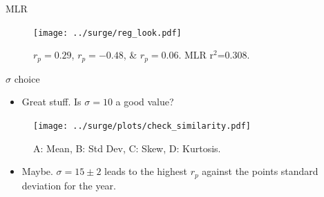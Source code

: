 \documentclass[usenames, dvipsnames]{beamer}
\begin{document}
\begin{frame}{MLR }
\vspace{-20pt}
\begin{figure}[htb!]
    \centering
    \hspace{-10pt}
    \texttt{[image: ../surge/reg\_look.pdf]}
    \vspace{-7pt}
   \caption{$r_p =0.29$, $r_p =-0.48$, &  $r_p=0.06$. MLR r$^2$=0.308.   }
    \label{fig:}
\end{figure}
\end{frame}


\begin{frame}{$\sigma$ choice}
\vspace{-20pt}
\begin{itemize}
\item Great stuff. Is $\sigma = 10$ a good value?
\end{itemize}
\vspace{-10pt}
\begin{figure}[htb!]
    \centering
    \texttt{[image: ../surge/plots/check\_similarity.pdf]}
   \caption{A: Mean, B: Std Dev, C: Skew, D: Kurtosis.}
\end{figure}
\vspace{-20pt}
\begin{itemize}
\item Maybe. $\sigma=15\pm2$ leads to the highest $r_p$ against
      the points standard deviation for the year.
\end{itemize}
\end{frame}
\end{document}
